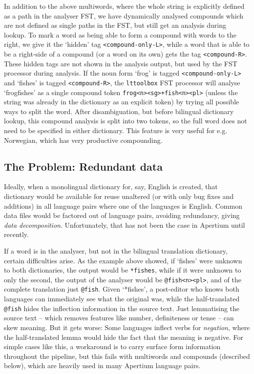 \documentclass[10pt, a4paper]{article}
\newcommand{\ana}[1]{\texttt{#1}}
\newcommand{\f}[1]{`#1'}
\newcommand{\tool}[1]{\texttt{#1}}
\begin{document}
In addition to the above multiwords, where the whole string is
explicitly defined as a path in the analyser FST, we have dynamically
analysed compounds which are not defined as single paths in the FST,
but still get an analysis during lookup. To mark a word as being able
to form a compound with words to the right, we give it the \f{hidden}
tag \ana{<compound-only-L>}, while a word that is able to be a
right-side of a compound (or a word on its own) gets the tag
\ana{<compound-R>}. These hidden tags are not shown in the analysis
output, but used by the FST processor during analysis. If the noun
form \f{frog} is tagged \ana{<compound-only-L>} and \f{fishes} is
tagged \ana{<compound-R>}, the \tool{lttoolbox} FST processor will
analyse \f{frogfishes} as a single compound token
\ana{frog<n><sg>+fish<n><pl>} (unless the string was already in the
dictionary as an explicit token) by trying all possible ways to split
the word. After disambiguation, but before bilingual dictionary
lookup, this compound analysis is split into two tokens, so the full
word does not need to be specified in either dictionary. This feature
is very useful for e.g. Norwegian, which has very productive
compounding.

\subsection{The Problem: Redundant data}
\label{sec:problem}

Ideally, when a monolingual dictionary for, say, English is created,
that dictionary would be available for reuse unaltered (or with only
bug fixes and additions) in all language pairs where one of the
languages is English. Common data files would be factored out of
language pairs, avoiding redundancy, giving \emph{data decomposition}.
Unfortunately, that has not been the case in Apertium until recently.

If a word is in the analyser, but not in the bilingual translation
dictionary, certain difficulties arise. As the example above showed,
if \f{fishes} were unknown to both dictionaries, the output would be
\ana{*fishes}, while if it were unknown to only the second, the output
of the analyser would be \ana{@fish<n><pl>}, and of the complete
translation just \ana{@fish}. Given \f{*fishes}, a post-editor who
knows both languages can immediately see what the original was, while
the half-translated \ana{@fish} hides the inflection information in
the source text. Just lemmatising the source text – which removes
features like number, definiteness or tense – can skew meaning. But it
gets worse: Some languages inflect verbs for \emph{negation}, where
the half-translated lemma would hide the fact that the meaning is
negative. For simple cases like this, a workaround is to carry surface
form information throughout the pipeline, but this fails with
multiwords and compounds (described below), which are heavily used in
many Apertium language pairs.
\end{document}
